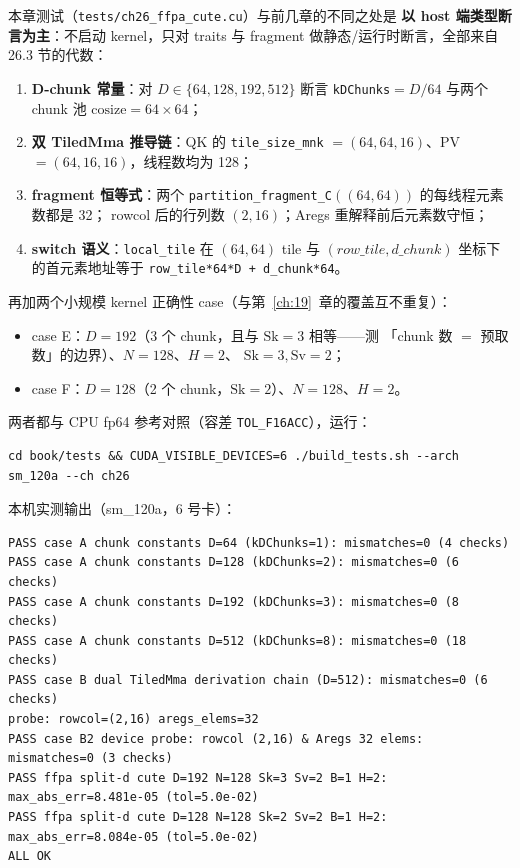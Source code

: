 本章测试（\texttt{tests/\allowbreak{}ch26\_\allowbreak{}ffpa\_\allowbreak{}cute.\allowbreak{}cu}）与前几章的不同之处是
\textbf{以 host 端类型断言为主}：不启动 kernel，只对 traits 与 fragment
做静态/运行时断言，全部来自 26.3 节的代数：

\begin{enumerate}[itemsep=2pt,topsep=2pt]
  \item \textbf{D-chunk 常量}：对 $D\in\{64,128,192,512\}$ 断言
        \texttt{kDChunks}$=D/64$ 与两个 chunk 池
        $\mathrm{cosize}=64\times64$；
  \item \textbf{双 TiledMma 推导链}：QK 的 \texttt{tile\_\allowbreak{}size\_\allowbreak{}mnk}
        $=(64,64,16)$、PV $=(64,16,16)$，线程数均为 128；
  \item \textbf{fragment 恒等式}：两个
        \texttt{partition\_\allowbreak{}fragment\_\allowbreak{}C}$((64,64))$ 的每线程元素数都是 32；
        rowcol 后的行列数 $(2,16)$；Aregs 重解释前后元素数守恒；
  \item \textbf{switch 语义}：\texttt{local\_tile} 在 $(64,64)$ tile 与
        $(row\_tile, d\_chunk)$ 坐标下的首元素地址等于
        \texttt{row\_\allowbreak{}tile*64*D + d\_\allowbreak{}chunk*64}。
\end{enumerate}

再加两个小规模 kernel 正确性 case（与第~\ref{ch:19}~章的覆盖互不重复）：

\begin{itemize}[itemsep=2pt,topsep=2pt]
  \item case E：$D=192$（3 个 chunk，且与 $\mathrm{Sk}{=}3$ 相等——测
        「chunk 数 $=$ 预取数」的边界）、$N=128$、$H=2$、
        $\mathrm{Sk}{=}3,\mathrm{Sv}{=}2$；
  \item case F：$D=128$（2 个 chunk，$\mathrm{Sk}{=}2$）、$N=128$、$H=2$。
\end{itemize}

两者都与 CPU fp64 参考对照（容差 \texttt{TOL\_F16ACC}），运行：

\begin{lstlisting}[style=console]
cd book/tests && CUDA_VISIBLE_DEVICES=6 ./build_tests.sh --arch sm_120a --ch ch26
\end{lstlisting}

本机实测输出（sm\_120a，6 号卡）：

{\scriptsize
\begin{lstlisting}[style=console]
PASS case A chunk constants D=64 (kDChunks=1): mismatches=0 (4 checks)
PASS case A chunk constants D=128 (kDChunks=2): mismatches=0 (6 checks)
PASS case A chunk constants D=192 (kDChunks=3): mismatches=0 (8 checks)
PASS case A chunk constants D=512 (kDChunks=8): mismatches=0 (18 checks)
PASS case B dual TiledMma derivation chain (D=512): mismatches=0 (6 checks)
probe: rowcol=(2,16) aregs_elems=32
PASS case B2 device probe: rowcol (2,16) & Aregs 32 elems: mismatches=0 (3 checks)
PASS ffpa split-d cute D=192 N=128 Sk=3 Sv=2 B=1 H=2: max_abs_err=8.481e-05 (tol=5.0e-02)
PASS ffpa split-d cute D=128 N=128 Sk=2 Sv=2 B=1 H=2: max_abs_err=8.084e-05 (tol=5.0e-02)
ALL OK
\end{lstlisting}
}

